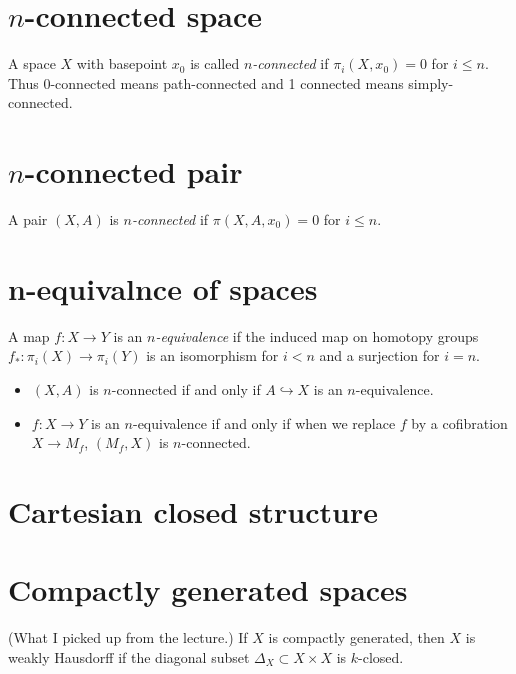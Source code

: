 \section{\texorpdfstring{$n$}{n}-connected space}

A space $X$ with basepoint $x_0$ is called {\it $n$-connected} if $\pi_i(X,x_0)=0$ for $i\leq n$. Thus 0-connected means path-connected and 1 connected means simply-connected.

\section{\texorpdfstring{$n$}{n}-connected pair}

A pair $(X,A)$ is {\it $n$-connected} if $\pi(X,A,x_0)=0$ for $i\leq n$.

\section{n-equivalnce of spaces}
\label{section-n-equivalence-of-spaces}

A map $f:X\to Y$ is an {\it  $n$-equivalence} if the induced map on homotopy groups $f_{*}:\pi_{i}(X)\to \pi_{i}(Y)$ is an isomorphism for $i<n$ and a surjection for $i=n$.

\begin{remark}
\begin{itemize}
\item $(X,A)$ is $n$-connected if and only if $A\hookrightarrow X$ is an $n$-equivalence.
\item $f:X\to Y$ is an $n$-equivalence if and only if when we replace $f$ by a cofibration $X\to M_{f}$, $(M_{f},X)$ is $n$-connected.
\end{itemize}
\end{remark}

\section{Cartesian closed structure}
\label{section-Cartesian-closed-structure}

\section{Compactly generated spaces}
\label{section-compactly-generated-spaces}

(What I picked up from the lecture.) If $X$ is compactly generated, then $X$ is
weakly Hausdorff if the diagonal subset $\Delta_X\subset X\times X$ is
$k$-closed.

